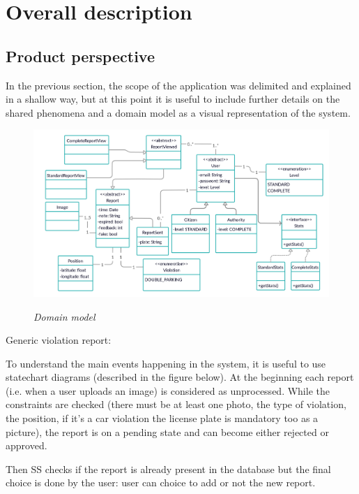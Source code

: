 \documentclass[../RASD.tex]{subfiles}
\begin{document}
    \chapter{Overall description}\label{ch:overall-description}
    \section{Product perspective}\label{sec:product-perspective}
    In the previous section, the scope of the application was delimited and explained in a shallow way, but at this point it is useful to include further details on the shared phenomena and a domain model as a visual representation of the system.

    \begin{figure}[H]
        \centering
        \includegraphics[scale = 1.1]{assets/domainModel.png}\\[1.6 cm]
        \caption[ \textit{Domain model}]{ \textit{Domain model}}
    \end{figure}
    Generic violation report:

    To understand the main events happening in the system, it is useful to use statechart diagrams (described in the figure below). At the beginning each report (i.e. when a user uploads an image) is considered as unprocessed. While the constraints are checked (there must be at least one photo, the type of violation, the position, if it’s a car violation the license plate is mandatory too as a picture), the report is on a pending state and can become either rejected or approved.

    Then SS checks if the report is already present in the database but the final choice is done by the user: user can choice to add or not the new report.
\end{document}
